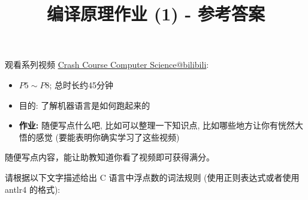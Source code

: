 \documentclass[a4paper, justified]{tufte-handout}
\title{编译原理作业 (1) - 参考答案}
\date{\zhtoday}
\begin{document}
\maketitle
\noplagiarism %
\begin{abstract}
\end{abstract}
\beginrequired
\begin{problem}
  观看系列视频 \href{https://www.bilibili.com/video/BV1EW411u7th?}{Crash Course Computer Science@bilibili}:
  \begin{itemize}
    \item $P5 \sim P8$; 总时长约45分钟
    \item 目的: 了解机器语言是如何跑起来的
    \item {\bf 作业:} 随便写点什么吧, 比如可以整理一下知识点, 比如哪些地方让你有恍然大悟的感觉
    (要能表明你确实学习了这些视频)
  \end{itemize}
\end{problem}

\begin{solution}
随便写点内容，能让助教知道你看了视频即可获得满分。
\end{solution}

\begin{problem}
  请根据以下文字描述给出 C 语言中浮点数的词法规则
  (使用正则表达式或者使用 antlr4 的格式):


\end{problem}
\end{document}
